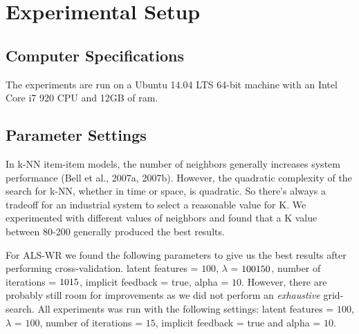 
\section{Experimental Setup}

\subsection{Computer Specifications}

The experiments are run on a Ubuntu 14.04 LTS 64-bit
machine with an Intel Core i7 920 CPU and 12GB of ram.

\subsection{Parameter Settings}


In k-NN item-item models, the number of neighbors 
generally increases system performance (Bell et al., 2007a, 2007b). However, the quadratic 
complexity of the search for k-NN, whether in time or space, is quadratic. So there's always a 
tradeoff for an industrial system \cite{Deshpande2004, Cremonesi2010} to select a 
reasonable value for K. We experimented with different values of neighbors and found that a K
value between 80-200 generally produced the best results.

For ALS-WR we found the following parameters to give us the best results after performing cross-validation.
latent features = $100$, $\lambda$ = $100\-150$, number of iterations = $10\-15$, implicit feedback = true, alpha = $10$.
However, there are probably still room for improvements as we did not perform an \emph{exhaustive} grid-search.
All experiments was run with the following settings: latent features = $100$, $\lambda$ = $100$, number of iterations = $15$,
implicit feedback = true and alpha = $10$.